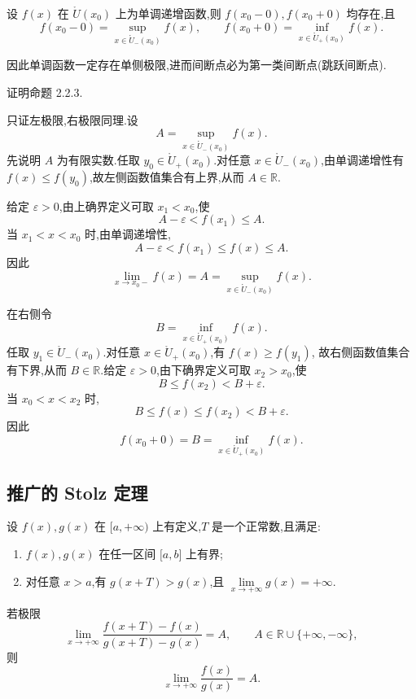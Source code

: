 \begin{proposition}
    设 $f(x)$ 在 $\mathring{U}(x_0)$ 上为单调递增函数,则 $f(x_0-0),f(x_0+0)$ 均存在,且
    \[
        f(x_0-0)=\sup\limits_{x\in\mathring{U}_{-}(x_0)}f(x),
        \qquad
        f(x_0+0)=\inf\limits_{x\in\mathring{U}_{+}(x_0)}f(x).
    \]
\end{proposition}

\begin{remark}
    因此单调函数一定存在单侧极限,进而间断点必为第一类间断点(跳跃间断点).
\end{remark}

\begin{example}
    证明命题 2.2.3.
\end{example}
\exampleblank

\begin{solution}
    只证左极限,右极限同理.设
    \[
        A=\sup\limits_{x\in\mathring{U}_{-}(x_0)}f(x).
    \]
    先说明 $A$ 为有限实数.任取 $y_0\in\mathring{U}_{+}(x_0)$.对任意
    $x\in\mathring{U}_{-}(x_0)$,由单调递增性有 $f(x)\leq f(y_0)$,故左侧函数值集合有上界,从而 $A\in\mathbb{R}$.

    给定 $\varepsilon>0$,由上确界定义可取 $x_1<x_0$,使
    \[
        A-\varepsilon<f(x_1)\leq A.
    \]
    当 $x_1<x<x_0$ 时,由单调递增性,
    \[
        A-\varepsilon<f(x_1)\leq f(x)\leq A.
    \]
    因此
    \[
        \displaystyle\lim\limits_{x\to x_0-}f(x)=A
        =\sup\limits_{x\in\mathring{U}_{-}(x_0)}f(x).
    \]

    在右侧令
    \[
        B=\inf\limits_{x\in\mathring{U}_{+}(x_0)}f(x).
    \]
    任取 $y_1\in\mathring{U}_{-}(x_0)$.对任意 $x\in\mathring{U}_{+}(x_0)$,有 $f(x)\geq f(y_1)$,
    故右侧函数值集合有下界,从而 $B\in\mathbb{R}$.给定 $\varepsilon>0$,由下确界定义可取 $x_2>x_0$,使
    \[
        B\leq f(x_2)<B+\varepsilon.
    \]
    当 $x_0<x<x_2$ 时,
    \[
        B\leq f(x)\leq f(x_2)<B+\varepsilon.
    \]
    因此
    \[
        f(x_0+0)=B
        =\inf\limits_{x\in\mathring{U}_{+}(x_0)}f(x).
    \]
\end{solution}



\subsection{推广的 Stolz 定理}

\begin{theorem}
    设 $f(x),g(x)$ 在 $\lbrack a,+\infty)$ 上有定义,$T$ 是一个正常数,且满足:
    \begin{enumerate}
        \item $f(x),g(x)$ 在任一区间 $\lbrack a,b\rbrack$ 上有界;
        \item 对任意 $x>a$,有 $g(x+T)>g(x)$,且
              $\displaystyle\lim\limits_{x\to+\infty}g(x)=+\infty$.
    \end{enumerate}
    若极限
    \[
        \lim\limits_{x\to+\infty}
        \dfrac{f(x+T)-f(x)}{g(x+T)-g(x)}
        =A,
        \qquad
        A\in\mathbb{R}\cup\{+\infty,-\infty\},
    \]
    则
    \[
        \lim\limits_{x\to+\infty}\dfrac{f(x)}{g(x)}=A.
    \]
\end{theorem}

